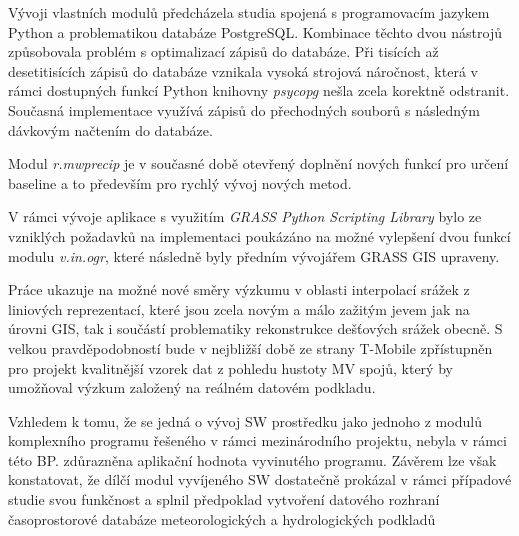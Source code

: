 \documentclass[a4paper,12pt,oneside]{report}
\begin{document}
Vývoji vlastních modulů předcházela studia spojená s programovacím
jazykem Python a problematikou databáze PostgreSQL. Kombinace těchto
dvou nástrojů způsobovala problém s optimalizací zápisů do databáze.
Při tisících až desetitisících zápisů do databáze vznikala vysoká
strojová náročnost, která v rámci dostupných funkcí Python knihovny
\textit{psycopg} nešla zcela korektně odstranit. Současná implementace
využívá zápisů do přechodných souborů s následným dávkovým načtením do
databáze.

Modul \textit{r.mwprecip} je v současné době otevřený doplnění nových
funkcí pro určení baseline a to především pro rychlý vývoj nových
metod.

V rámci vývoje aplikace s využitím \textit{GRASS Python Scripting
  Library} bylo ze vzniklých požadavků na implementaci poukázáno na
možné vylepšení dvou funkcí modulu \textit{v.in.ogr}, které následně
byly předním vývojářem GRASS GIS upraveny.

Práce ukazuje na možné nové směry výzkumu v oblasti
interpolací srážek z liniových reprezentací, které jsou zcela novým a
málo zažitým jevem jak na úrovni GIS, tak i  součástí problematiky
rekonstrukce dešťových srážek obecně. S velkou pravděpodobností bude v
nejbližší době ze strany T-Mobile zpřístupněn pro projekt kvalitnější
vzorek dat z pohledu hustoty MV spojů, který by umožňoval výzkum
založený na reálném datovém podkladu.

Vzhledem k tomu, že se jedná o vývoj SW prostředku jako jednoho z modulů komplexního programu řešeného v rámci mezinárodního projektu, nebyla v rámci této BP. zdůrazněna aplikační hodnota vyvinutého programu. Závěrem lze však konstatovat, že dílčí modul vyvíjeného SW dostatečně prokázal v rámci případové studie svou funkčnost a splnil předpoklad vytvoření datového rozhraní časoprostorové databáze meteorologických a hydrologických podkladů
\end{document}
